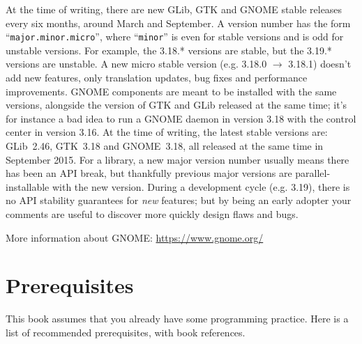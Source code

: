 At the time of writing, there are new GLib, GTK and GNOME stable releases every six months, around March and September. A version number has the form ``\texttt{major.minor.micro}'', where ``\texttt{minor}'' is even for stable versions and is odd for unstable versions. For example, the 3.18.* versions are stable, but the 3.19.* versions are unstable. A new micro stable version (e.g. 3.18.0 $\rightarrow$ 3.18.1) doesn't add new features, only translation updates, bug fixes and performance improvements. GNOME components are meant to be installed with the same versions, alongside the version of GTK and GLib released at the same time; it's for instance a bad idea to run a GNOME daemon in version 3.18 with the control center in version 3.16. At the time of writing, the latest stable versions are: GLib~2.46, GTK~3.18 and GNOME~3.18, all released at the same time in September 2015. For a library, a new major version number usually means there has been an API break, but thankfully previous major versions are parallel-installable with the new version. During a development cycle (e.g. 3.19), there is no API stability guarantees for \emph{new} features; but by being an early adopter your comments are useful to discover more quickly design flaws and bugs.

More information about GNOME: \url{https://www.gnome.org/}

\section{Prerequisites}

This book assumes that you already have some programming practice. Here is a list of recommended prerequisites, with book references.


